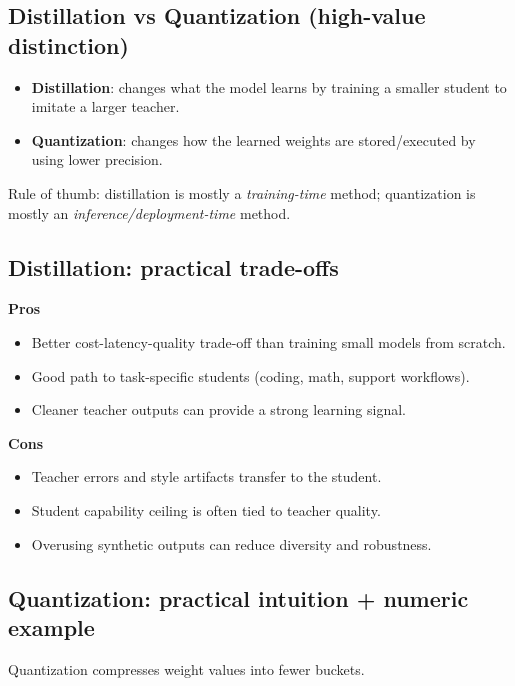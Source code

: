 \subsection{Distillation vs Quantization (high-value distinction)}

\begin{itemize}[leftmargin=1.5em]
    \item \textbf{Distillation}: changes what the model learns by training a smaller student to imitate a larger teacher.
    \item \textbf{Quantization}: changes how the learned weights are stored/executed by using lower precision.
\end{itemize}

Rule of thumb: distillation is mostly a \textit{training-time} method; quantization is mostly an \textit{inference/deployment-time} method.

\subsection{Distillation: practical trade-offs}

\textbf{Pros}
\begin{itemize}[leftmargin=1.5em]
    \item Better cost-latency-quality trade-off than training small models from scratch.
    \item Good path to task-specific students (coding, math, support workflows).
    \item Cleaner teacher outputs can provide a strong learning signal.
\end{itemize}

\textbf{Cons}
\begin{itemize}[leftmargin=1.5em]
    \item Teacher errors and style artifacts transfer to the student.
    \item Student capability ceiling is often tied to teacher quality.
    \item Overusing synthetic outputs can reduce diversity and robustness.
\end{itemize}

\subsection{Quantization: practical intuition + numeric example}

Quantization compresses weight values into fewer buckets.

